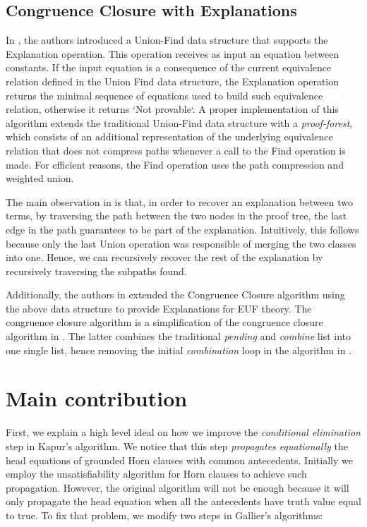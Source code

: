 \documentclass[sigconf,authordraft]{acmart}
\begin{document}
\subsection{Congruence Closure with Explanations}

In \cite{10.1007/978-3-540-32033-3_33}, the authors introduced a Union-Find
data structure that supports the Explanation operation. This operation receives
as input an equation between constants. If the input equation is a consequence
of the current equivalence relation defined in the Union Find data structure, the Explanation
operation returns the minimal sequence of equations used to build such equivalence relation,
otherwise it returns `Not provable`. A proper implementation of this algorithm extends the traditional
Union-Find data structure with a \emph{proof-forest}, which consists of an additional
representation of the underlying equivalence relation that does not compress
paths whenever a call to the Find operation is made. For efficient reasons, the Find operation
uses the path compression and weighted union.

The main observation in \cite{10.1007/978-3-540-32033-3_33} is that, in order to
recover an explanation between two terms, by traversing the path between the two nodes
in the proof tree, the last edge in the path guarantees to be part of the explanation.
Intuitively, this follows because only the last Union operation was responsible of merging
the two classes into one. Hence, we can recursively recover the rest of the
explanation by recursively traversing the subpaths found.

Additionally, the authors in \cite{10.1007/978-3-540-32033-3_33} extended the
Congruence Closure algorithm \cite{10.1007/978-3-540-39813-4_5} using the above
data structure to provide Explanations for EUF theory. The congruence closure algorithm
is a simplification of the congruence closure algorithm in \cite{10.1145/322217.322228}.
The latter combines the traditional \emph{pending} and \emph{combine} list into one
single list, hence removing the initial \emph{combination} loop in the algorithm in
\cite{10.1145/322217.322228}.

\section{Main contribution} \label{aha}

First, we explain a high level ideal on how we improve the \emph{conditional elimination}
step in Kapur's algorithm. We notice that this step \emph{propagates equationally} the
head equations of grounded Horn clauses with common antecedents. Initially we employ the
unsatisfiability algorithm for Horn clauses to achieve such propagation. However, the original
algorithm will not be enough because it will only propagate the head equation when all the
antecedents have truth value equal to true. To fix that problem, we modify two steps in Gallier's
algorithms:
\end{document}
